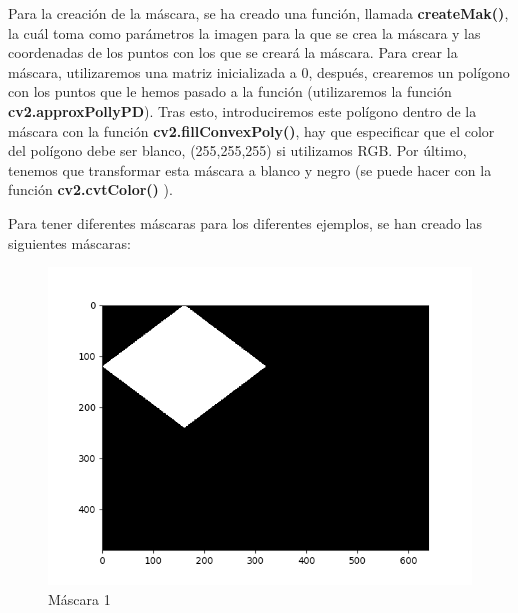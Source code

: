 	\vspace{0.06in}
	Para la creación de la máscara, se ha creado una función, llamada \textbf{createMak()}, la cuál toma como parámetros la imagen para la que se crea la máscara y las coordenadas de los puntos con los que se creará la máscara. Para crear la máscara, utilizaremos una matriz inicializada a 0, después, crearemos un polígono con los puntos que le hemos pasado a la función (utilizaremos la función \textbf{cv2.approxPollyPD}). Tras esto, introduciremos este polígono dentro de la máscara con la función \textbf{cv2.fillConvexPoly()}, hay que especificar que el color del polígono debe ser blanco, (255,255,255) si utilizamos RGB. Por último, tenemos que transformar esta máscara a blanco y negro (se puede hacer con la función \textbf{cv2.cvtColor()} ).
	
	\vspace{0.06in}
	Para tener diferentes máscaras para los diferentes ejemplos, se han creado las siguientes máscaras:
	
	\begin{figure}[H]
		\centering
		\includegraphics[scale=0.4]{./imagenes/mask1.png}
		\caption{Máscara 1}
		\label{fig:mask1}
	\end{figure}
	
